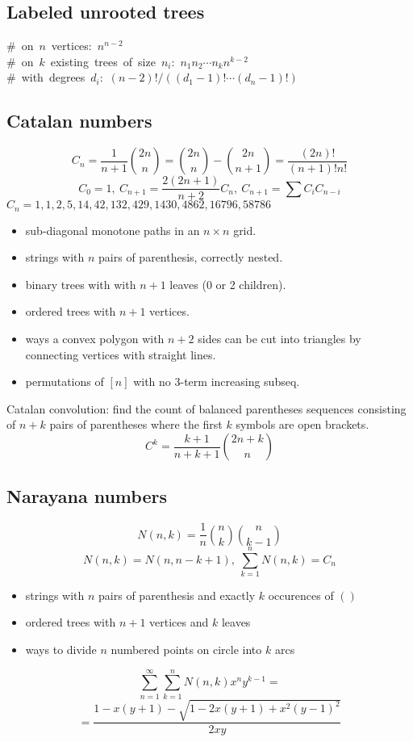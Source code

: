 	\subsection{Labeled unrooted trees}
		\mbox{\# on $n$ vertices: $n^{n-2}$} \\
		\mbox{\# on $k$ existing trees of size $n_i$: $n_1n_2\cdots n_k n^{k-2}$} \\
		\mbox{\# with degrees $d_i$: $(n-2)! / ((d_1-1)! \cdots (d_n-1)!)$}

	\subsection{Catalan numbers}
		\[ C_n=\frac{1}{n+1}\binom{2n}{n}= \binom{2n}{n}-\binom{2n}{n+1} = \frac{(2n)!}{(n+1)!n!} \]
		\[ C_0=1,\ C_{n+1} = \frac{2(2n+1)}{n+2}C_n,\ C_{n+1}=\sum C_iC_{n-i} \]
		${C_n = 1, 1, 2, 5, 14, 42, 132, 429, 1430, 4862, 16796, 58786}$
		\begin{itemize}[noitemsep]
			\item sub-diagonal monotone paths in an $n\times n$ grid.
			\item strings with $n$ pairs of parenthesis, correctly nested.
			\item binary trees with with $n+1$ leaves (0 or 2 children).
			\item ordered trees with $n+1$ vertices.
			\item ways a convex polygon with $n+2$ sides can be cut into triangles by connecting vertices with straight lines.
			\item permutations of $[n]$ with no 3-term increasing subseq.
		\end{itemize}
		Catalan convolution: find the count of balanced parentheses sequences consisting of $n+k$ pairs of parentheses where the first $k$ symbols are open brackets.
		\[ C^k=\frac{k+1}{n+k+1}\binom{2n+k}{n}\]
	\subsection{Narayana numbers}
		\[ N(n, k) = \frac{1}{n} \binom{n}{k} \binom{n}{k-1} \]
		\[N(n, k) = N(n, n - k + 1),\ \sum_{k=1}^{n}N(n, k) = C_n \]
		\begin{itemize}[noitemsep]
			\item strings with $n$ pairs of parenthesis and exactly $k$ occurences of $()$
			\item ordered trees with $n+1$ vertices and $k$ leaves
			\item ways to divide $n$ numbered points on circle into $k$ arcs
		\end{itemize}
		\[ \sum_{n=1}^{\infty}\sum_{k=1}^{n} N(n, k)x^{n}y^{k-1} = \]
		\[ = \frac{1 - x(y + 1) - \sqrt{1 - 2x(y+1) + x^{2}(y-1)^{2}}}{2xy} \]
